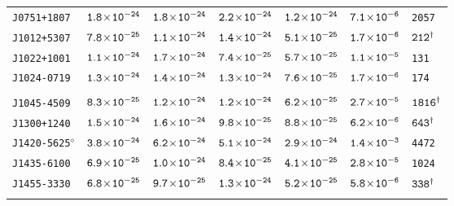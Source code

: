 \begin{longtable}{l | c | c | c | c | c | l}
\scriptsize{\tt{J0751+1807}} & \scriptsize{$\tt{1.8\!\times\!10^{-24}}$} & \scriptsize{$\tt{1.8\!\times\!10^{-24}}$} & \scriptsize{$\tt{2.2\!\times\!10^{-24}}$} &\scriptsize{$\tt{1.2\!\times\!10^{-24}}$} & \scriptsize{$\tt{7.1\!\times\!10^{-6}}$} & \scriptsize{\tt{2057}} \\[-16pt] 
\scriptsize{\tt{J1012+5307}} & \scriptsize{$\tt{7.8\!\times\!10^{-25}}$} & \scriptsize{$\tt{1.1\!\times\!10^{-24}}$} & \scriptsize{$\tt{1.4\!\times\!10^{-24}}$} & \scriptsize{$\tt{5.1\!\times\!10^{-25}}$} & \scriptsize{$\tt{1.7\!\times\!10^{-6}}$} & \scriptsize{$\tt{212^{\dagger}}$} \\[-16pt] 
\scriptsize{\tt{J1022+1001}} & \scriptsize{$\tt{1.1\!\times\!10^{-24}}$} & \scriptsize{$\tt{1.7\!\times\!10^{-24}}$} & \scriptsize{$\tt{7.4\!\times\!10^{-25}}$} &\scriptsize{$\tt{5.7\!\times\!10^{-25}}$} & \scriptsize{$\tt{1.1\!\times\!10^{-5}}$} & \scriptsize{\tt{131}} \\[-16pt] 
\scriptsize{\tt{J1024-0719}} & \scriptsize{$\tt{1.3\!\times\!10^{-24}}$} & \scriptsize{$\tt{1.4\!\times\!10^{-24}}$} & \scriptsize{$\tt{1.3\!\times\!10^{-24}}$} &\scriptsize{$\tt{7.6\!\times\!10^{-25}}$} & \scriptsize{$\tt{1.7\!\times\!10^{-6}}$} & \scriptsize{\tt{174}} \\[-16pt] 
\\[-20pt] 
\scriptsize{\tt{J1045-4509}} & \scriptsize{$\tt{8.3\!\times\!10^{-25}}$} & \scriptsize{$\tt{1.2\!\times\!10^{-24}}$} & \scriptsize{$\tt{1.2\!\times\!10^{-24}}$} & \scriptsize{$\tt{6.2\!\times\!10^{-25}}$} & \scriptsize{$\tt{2.7\!\times\!10^{-5}}$} & \scriptsize{$\tt{1816^{\dagger}}$} \\[-16pt] 
\scriptsize{\tt{J1300+1240}} & \scriptsize{$\tt{1.5\!\times\!10^{-24}}$} & \scriptsize{$\tt{1.6\!\times\!10^{-24}}$} & \scriptsize{$\tt{9.8\!\times\!10^{-25}}$} & \scriptsize{$\tt{8.8\!\times\!10^{-25}}$} & \scriptsize{$\tt{6.2\!\times\!10^{-6}}$} & \scriptsize{$\tt{643^{\dagger}}$} \\[-16pt] 
\scriptsize{\tt{J1420-5625}$^{\diamond}$} & \scriptsize{$\tt{3.8\!\times\!10^{-24}}$} &
\scriptsize{$\tt{6.2\!\times\!10^{-24}}$} & \scriptsize{$\tt{5.1\!\times\!10^{-24}}$} &\scriptsize{$\tt{2.9\!\times\!10^{-24}}$} &
\scriptsize{$\tt{1.4\!\times\!10^{-3}}$} & \scriptsize{\tt{4472}} \\[-16pt] 
\scriptsize{\tt{J1435-6100}} & \scriptsize{$\tt{6.9\!\times\!10^{-25}}$} & \scriptsize{$\tt{1.0\!\times\!10^{-24}}$} & \scriptsize{$\tt{8.4\!\times\!10^{-25}}$} &\scriptsize{$\tt{4.1\!\times\!10^{-25}}$} & \scriptsize{$\tt{2.8\!\times\!10^{-5}}$} & \scriptsize{\tt{1024}} \\[-16pt] 
\scriptsize{\tt{J1455-3330}} & \scriptsize{$\tt{6.8\!\times\!10^{-25}}$} & \scriptsize{$\tt{9.7\!\times\!10^{-25}}$} & \scriptsize{$\tt{1.3\!\times\!10^{-24}}$} & \scriptsize{$\tt{5.2\!\times\!10^{-25}}$} & \scriptsize{$\tt{5.8\!\times\!10^{-6}}$} & \scriptsize{$\tt{338^{\dagger}}$} \\[-16pt] 
\\[-20pt] 

\end{longtable}
